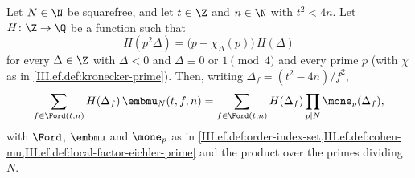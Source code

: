 Let $N\in\N$ be squarefree, and let $t\in\Z$ and $n\in\N$ with $t^2<4n$. Let $H\colon\Z\to\Q$ be a function such that
\[
  H(p^2\Delta)=\bigl(p-\chi_\Delta(p)\bigr)\,H(\Delta)
\]
for every $\Delta\in\Z$ with $\Delta<0$ and $\Delta\equiv0$ or $1\pmod 4$ and every prime $p$ (with $\chi$ as in \cref{III.ef.def:kronecker-prime}).
Then, writing $\Delta_f=(t^2-4n)/f^2$,
\[
  \sum_{f\in\Ford(t,n)}H(\Delta_f)\,\embmu_N(t,f,n)=\sum_{f\in\Ford(t,n)}H(\Delta_f)\prod_{p\mid N}\mone_p(\Delta_f),
\]
with $\Ford$, $\embmu$ and $\mone_p$ as in \cref{III.ef.def:order-index-set,III.ef.def:cohen-mu,III.ef.def:local-factor-eichler-prime} and the
product over the primes dividing $N$.
